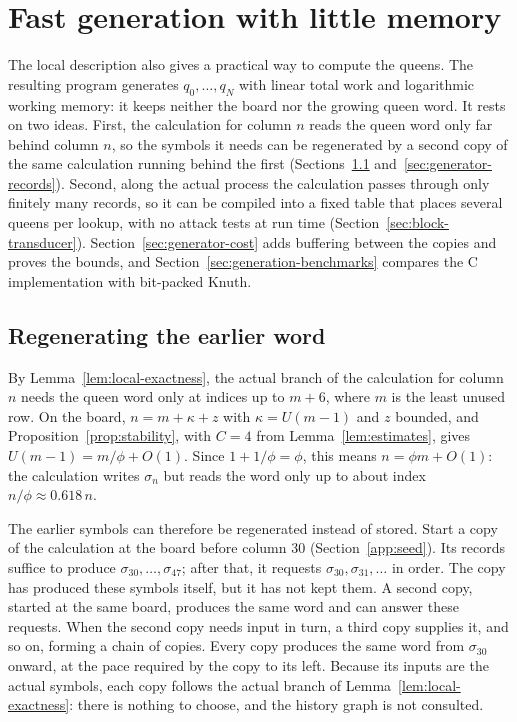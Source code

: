 \section{Fast generation with little memory}\label{sec:generation}

The local description also gives a practical way to compute the
queens. The resulting program generates $q_0,\dots,q_N$ with linear
total work and logarithmic working memory: it keeps neither the
board nor the growing queen word. It rests on two ideas. First, the
calculation for column $n$ reads the queen word only far behind
column $n$, so the symbols it needs can be regenerated by a second
copy of the same calculation running behind the first
(Sections~\ref{sec:generator-idea} and~\ref{sec:generator-records}).
Second, along the actual process the calculation passes through only
finitely many records, so it can be compiled into a fixed table that
places several queens per lookup, with no attack tests at run time
(Section~\ref{sec:block-transducer}).
Section~\ref{sec:generator-cost} adds buffering between the copies and
proves the bounds, and Section~\ref{sec:generation-benchmarks}
compares the C implementation with bit-packed Knuth.

\subsection{Regenerating the earlier word}\label{sec:generator-idea}

By Lemma~\ref{lem:local-exactness}, the actual branch of the
calculation for column $n$ needs the queen word only at indices up
to $m+6$, where $m$ is the least unused row. On the board,
$n=m+\kappa+z$ with $\kappa=U(m-1)$ and $z$ bounded, and
Proposition~\ref{prop:stability}, with $C=4$ from
Lemma~\ref{lem:estimates}, gives $U(m-1)=m/\phi+O(1)$. Since
$1+1/\phi=\phi$, this means $n=\phi m+O(1)$: the calculation writes
$\sigma_n$ but reads the word only up to about index $n/\phi\approx
0.618\,n$.

The earlier symbols can therefore be regenerated instead of stored.
Start a copy of the calculation at the board before column $30$
(Section~\ref{app:seed}). Its records suffice to produce
$\sigma_{30},\dots,\sigma_{47}$; after that, it requests
$\sigma_{30},\sigma_{31},\dots$ in order. The copy has produced these
symbols itself, but it has not kept them. A second copy, started at
the same board, produces the same word and can answer these requests.
When the second copy needs input in turn, a third copy supplies it,
and so on, forming a chain of copies.
Every copy produces the same word from $\sigma_{30}$ onward, at the
pace required by the copy to its left. Because its inputs are the
actual symbols, each copy follows the actual branch of
Lemma~\ref{lem:local-exactness}: there is nothing to choose, and the
history graph is not consulted.

